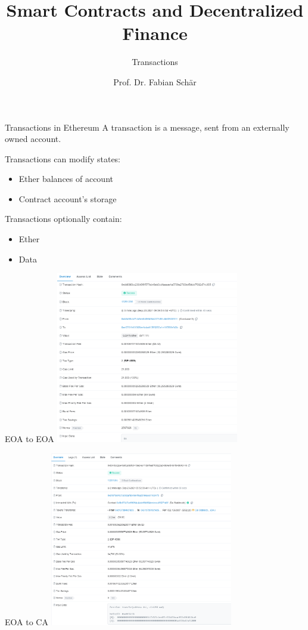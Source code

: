 \documentclass[handout]{beamer}
\title{Smart Contracts and Decentralized Finance}
\subtitle{Transactions}
\author{Prof. Dr. Fabian Schär}
\institute{University of Basel}
\begin{document}
\thispagestyle{empty}
\begin{frame}[noframenumbering]
	\titlepage
\end{frame}

\begin{frame}{Transactions in Ethereum}
A transaction is a message, sent from an externally owned account.
\vspace{1em}

Transactions can modify states:
	\begin{itemize}
		\item<1-> Ether balances of account
		\item<2-> Contract account's storage
	\end{itemize}
\vspace{1em}

Transactions optionally contain:
	\begin{itemize}
		\item<1-> Ether
		\item<2-> Data
	\end{itemize}
\vspace{1em}


\end{frame}

\begin{frame}{EOA to EOA}
\center
\includegraphics[width=8cm]{../assets/images/EOA_to_EOA}

\end{frame}

\begin{frame}{EOA to CA}
\center
\includegraphics[width=8cm]{../assets/images/EOA_to_CA}

\end{frame}
\end{document}
